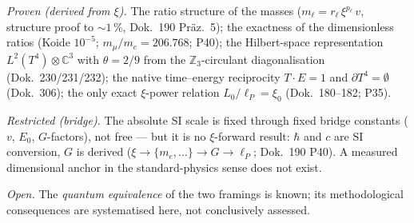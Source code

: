 \documentclass[11pt,a4paper]{article}
\begin{document}
\emph{Proven (derived from $\xi$).} The ratio structure of the masses ($m_\ell=r_\ell\,\xi^{p_\ell}\,v$, structure proof to ${\sim}1\,\%$, Dok.~190 Präz.~5); the exactness of the dimensionless ratios (Koide $10^{-5}$; $m_\mu/m_e=206.768$; P40); the Hilbert-space representation $L^2(T^4)\otimes\mathbb{C}^3$ with $\theta=2/9$ from the $\mathbb{Z}_3$-circulant diagonalisation (Dok.~230/231/232); the native time--energy reciprocity $T\cdot E=1$ and $\partial T^4=\emptyset$ (Dok.~306); the only exact $\xi$-power relation $L_0/\ell_P=\xi_0$ (Dok.~180--182; P35).

\emph{Restricted (bridge).} The absolute SI scale is fixed through fixed bridge constants ($v$, $E_0$, $G$-factors), not free --- but it is no $\xi$-forward result: $\hbar$ and $c$ are SI conversion, $G$ is derived ($\xi\to\{m_e,\dots\}\to G\to\ell_P$; Dok.~190 P40). A measured dimensional anchor in the standard-physics sense does not exist.

\emph{Open.} The \emph{quantum equivalence} of the two framings is known; its methodological consequences are systematised here, not conclusively assessed.
\end{document}

